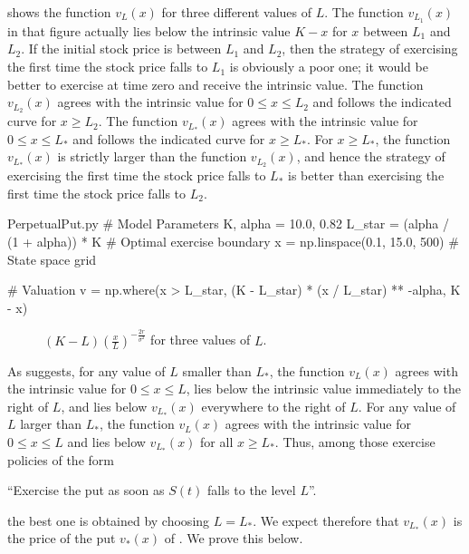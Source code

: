  shows the function \(v_L(x)\) for three different values of \(L\). The function \(v_{L_1}(x)\) in that figure actually lies below the intrinsic value \(K - x\) for \(x\) between \(L_1\) and \(L_2\). If the initial stock price is between \(L_1\) and \(L_2\), then the strategy of exercising the first time the stock price falls to \(L_1\) is obviously a poor one; it would be better to exercise at time zero and receive the intrinsic value. The function \(v_{L_2}(x)\) agrees with the intrinsic value for \(0 \le x \le L_2\) and follows the indicated curve for \(x \ge L_2\). The function \(v_{L_*}(x)\) agrees with the intrinsic value for \(0 \le x \le L_*\) and follows the indicated curve for \(x \ge L_*\). For \(x \ge L_*\), the function \(v_{L_*}(x)\) is strictly larger than the function \(v_{L_2}(x)\), and hence the strategy of exercising the first time the stock price falls to \(L_*\) is better than exercising the first time the stock price falls to \(L_2\).


\begin{Pcode}{PerpetualPut.py}
	# Model Parameters
	K, alpha = 10.0, 0.82
	L_star = (alpha / (1 + alpha)) * K  # Optimal exercise boundary
	x = np.linspace(0.1, 15.0, 500)     # State space grid

	# Valuation
	v = np.where(x > L_star,
	(K - L_star) * (x / L_star) ** -alpha,
	K - x)
\end{Pcode}

\begin{figure}[H]
	\centering
	
	\caption{\((K-L)(\frac{x}{L})^{-\frac{2r}{\sigma^2}}\) for three values of \(L\).}\label{fig:ExerciseBoundaryValue}
\end{figure}

As  suggests, for any value of \(L\) smaller than \(L_*\), the function \(v_L(x)\) agrees with the intrinsic value for \(0 \le x \le L\), lies below the intrinsic value immediately to the right of \(L\), and lies below \(v_{L_{*}}(x)\) everywhere to the right of \(L\). For any value of \(L\) larger than \(L_*\), the function \(v_L(x)\) agrees with the intrinsic value for \(0 \le x \le L\) and lies below \(v_{L_{*}}(x)\) for all \(x \ge L_*\). Thus, among those exercise policies of the form
\begin{center}
	``Exercise the put as soon as \(S(t)\) falls to the level \(L\)''.
\end{center}
the best one is obtained by choosing \(L = L_*\). We expect therefore that \(v_{L_{*}}(x)\) is the price of the put \(v_*(x)\) of . We prove this below.

